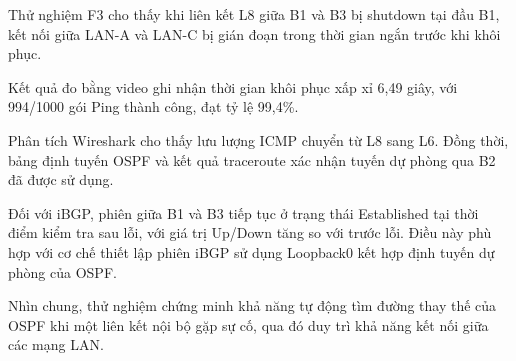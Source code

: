 Thử nghiệm F3 cho thấy khi liên kết L8
giữa B1 và B3 bị shutdown tại đầu B1,
kết nối giữa LAN-A và LAN-C bị gián đoạn
trong thời gian ngắn trước khi khôi phục.

Kết quả đo bằng video ghi nhận thời gian
khôi phục xấp xỉ 6,49 giây, với 994/1000
gói Ping thành công, đạt tỷ lệ 99,4\%.

Phân tích Wireshark cho thấy lưu lượng ICMP
chuyển từ L8 sang L6. Đồng thời, bảng định tuyến
OSPF và kết quả traceroute xác nhận tuyến
dự phòng qua B2 đã được sử dụng.

Đối với iBGP, phiên giữa B1 và B3 tiếp tục
ở trạng thái Established tại thời điểm kiểm tra
sau lỗi, với giá trị Up/Down tăng so với trước lỗi.
Điều này phù hợp với cơ chế thiết lập phiên
iBGP sử dụng Loopback0 kết hợp định tuyến
dự phòng của OSPF.

Nhìn chung, thử nghiệm chứng minh khả năng
tự động tìm đường thay thế của OSPF khi một
liên kết nội bộ gặp sự cố, qua đó duy trì
khả năng kết nối giữa các mạng LAN.
